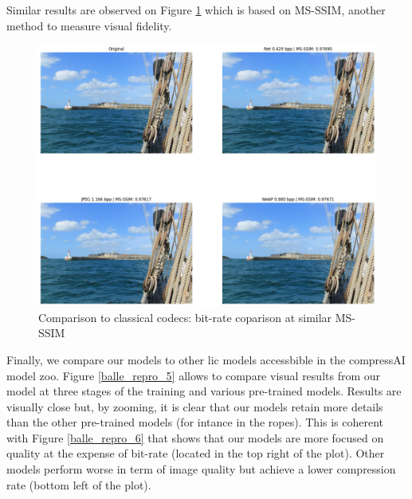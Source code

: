 Similar results are observed on Figure \ref{balle_repro_4} which is based on MS-SSIM, another method to measure visual fidelity.

\begin{figure}
    \centering
    \includegraphics[width=15cm]{img/balle_repro_4.png}
    \caption{Comparison to classical codecs: bit-rate coparison at similar MS-SSIM}
    \label{balle_repro_4}
\end{figure}

Finally, we compare our models to other \acrshort{lic} models accessbible in the compressAI model zoo. Figure \ref{balle_repro_5} allows to compare visual results from our model at three stages of the training and various pre-trained models. Results are visually close but, by zooming, it is clear that our models retain more details than the other pre-trained models (for intance in the ropes). This is coherent with Figure \ref{balle_repro_6} that shows that our models are more focused on quality at the expense of bit-rate (located in the top right of the plot). Other models perform worse in term of image quality but achieve a lower compression rate (bottom left of the plot).

